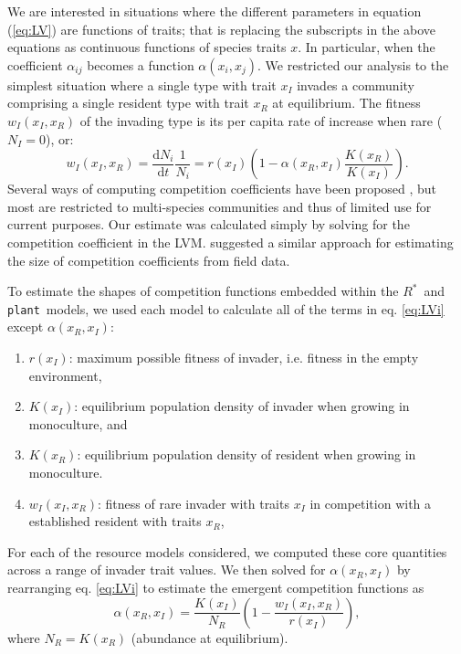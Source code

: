 \documentclass[a4paper,11pt]{article}
\newcommand{\ud}{\ensuremath{\mathrm{d}}}
\newcommand{\Rstar}{\ensuremath{R^*}}
\newcommand{\plant}{{\tt plant}}
\begin{document}
We are interested in situations where the different parameters in equation (\ref{eq:LV}) are functions of traits; that is replacing the subscripts in the above equations as continuous functions of species traits $x$. In particular, when the coefficient $\alpha_{ij}$ becomes a function $\alpha(x_i, x_j)$. We restricted our analysis to the simplest situation where a single type with trait $x_I$ invades a community comprising a single resident type with trait $x_R$ at equilibrium. The fitness $w_I(x_I, x_R)$ of the invading type is its per capita rate of increase when rare ($N_I = 0$), or: 
\begin{equation}\label{eq:LVi}
  w_I(x_I, x_R) = \frac{\ud N_i}{\ud t} \frac{1}{N_i} =
    r(x_I)\left(1 - \alpha(x_R, x_I) \frac{K(x_R)}{K(x_I)}\right).
\end{equation}
Several ways of computing competition coefficients have been proposed \citep[e.g.,][]{Abrams-1987,Abrams-2008}, but most are restricted to multi-species communities and thus of limited use for current purposes. Our estimate was calculated simply by solving for the competition coefficient in the LVM. \citet{Ricklefs-1973} suggested a similar approach for estimating the size of competition coefficients from field data. 

To estimate the shapes of competition functions embedded within the \Rstar\ and \plant\ models, we used each model to calculate all of the terms in eq. \ref{eq:LVi} except $\alpha(x_R, x_I)$:
\begin{enumerate}
\item $r(x_I)$: maximum possible fitness of invader, i.e. fitness in the empty environment,
\item $K(x_I)$: equilibrium population density of invader when growing in monoculture, and
\item $K(x_R)$: equilibrium population density of resident when growing in monoculture.
\item $w_I(x_I, x_R)$: fitness of rare invader with traits $x_I$ in competition with a established resident with traits $x_R$,
\end{enumerate}

For each of the resource models considered, we computed these core quantities across a range of invader trait values. We then solved for $\alpha(x_R, x_I)$ by rearranging eq. \ref{eq:LVi} to estimate the emergent competition functions as
\begin{equation} \label{eq:alpha}
  \alpha(x_R, x_I) = \frac{K(x_I)}{N_R} \left(1 - \frac{w_I(x_I, x_R)}{r(x_I)}\right),
\end{equation}
where $N_R = K(x_R)$ (abundance at equilibrium). 
\end{document}
